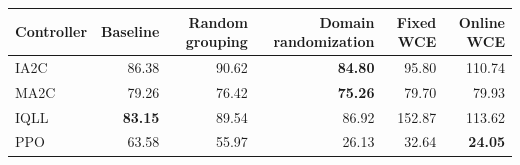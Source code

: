 \begin{tabular}{lrrrrr}
\hline
Controller & Baseline & Random grouping & Domain randomization & Fixed WCE & Online WCE \\
\hline
IA2C & 86.38 & 90.62 & \textbf{84.80} & 95.80 & 110.74 \\
MA2C & 79.26 & 76.42 & \textbf{75.26} & 79.70 & 79.93 \\
IQLL & \textbf{83.15} & 89.54 & 86.92 & 152.87 & 113.62 \\
PPO & 63.58 & 55.97 & 26.13 & 32.64 & \textbf{24.05} \\
\hline
\end{tabular}
